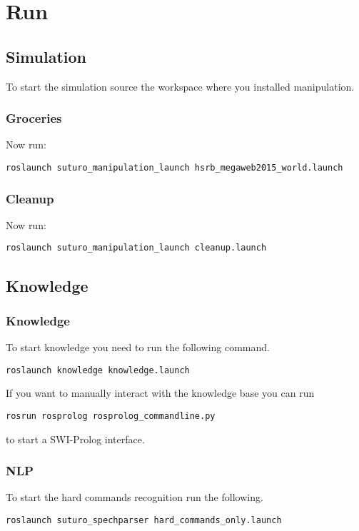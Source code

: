 \documentclass[main.tex]{subfiles}
\begin{document}
	\section{Run}
	\subsection{Simulation}
	To start the simulation source the workspace where you installed manipulation.
	\subsubsection{Groceries}
	Now run:
	\begin{lstlisting}
roslaunch suturo_manipulation_launch hsrb_megaweb2015_world.launch
\end{lstlisting}

	\subsubsection{Cleanup}
	Now run:
	\begin{lstlisting}
roslaunch suturo_manipulation_launch cleanup.launch
\end{lstlisting}

	\subsection{Knowledge}
	\subsubsection{Knowledge}
	To start knowledge you need to run the following command.
	\begin{lstlisting}
roslaunch knowledge knowledge.launch
\end{lstlisting}
If you want to manually interact with the knowledge base you can run 
\begin{lstlisting}
rosrun rosprolog rosprolog_commandline.py
\end{lstlisting}
to start a SWI-Prolog interface.
	
	\subsubsection{NLP}
	
	To start the hard commands recognition run the following.
	
	\begin{lstlisting}
roslaunch suturo_spechparser hard_commands_only.launch
\end{lstlisting}
	
\end{document}
